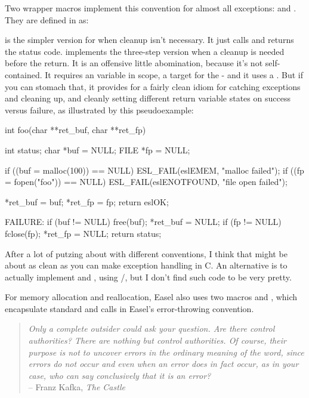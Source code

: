 Two wrapper macros implement this convention for almost all
exceptions:  and . They are
defined in  as:



 is the simpler version for when cleanup isn't
necessary. It just calls  and returns the status
code.  implements the three-step version when a
cleanup is needed before the return. It is an offensive little
abomination, because it's not self-contained. It requires an
 variable in scope, a  target for
the  - and it uses a . But if you can stomach
that, it provides for a fairly clean idiom for catching exceptions and
cleaning up, and cleanly setting different return variable states on
success versus failure, as illustrated by this pseudoexample:

\begin{cchunk}
int 
foo(char **ret_buf, char **ret_fp)
{
    int status;
    char *buf = NULL;
    FILE *fp  = NULL;

    if ((buf = malloc(100))  == NULL) ESL_FAIL(eslEMEM,      "malloc failed");
    if ((fp  = fopen("foo")) == NULL) ESL_FAIL(eslENOTFOUND, "file open failed");

    *ret_buf = buf;
    *ret_fp  = fp;
    return eslOK;

  FAILURE:
    if (buf != NULL) free(buf);  *ret_buf = NULL;
    if (fp  != NULL) fclose(fp); *ret_fp  = NULL;
    return status;
}
\end{cchunk}

After a lot of putzing about with different conventions, I think that
might be about as clean as you can make exception handling in C. An
alternative is to actually implement  and ,
using /, but I don't find such code
to be very pretty.

For memory allocation and reallocation, Easel also uses two macros
 and , which encapsulate
standard  and  calls in Easel's
error-throwing convention.


\vspace*{\fill}
\begin{quote}
\emph{Only a complete outsider could ask your question. Are there
control authorities? There are nothing but control authorities. Of
course, their purpose is not to uncover errors in the ordinary meaning
of the word, since errors do not occur and even when an error does in
fact occur, as in your case, who can say conclusively that it is an
error?}\\ \hspace*{\fill} -- Franz Kafka, \emph{The Castle}
\end{quote}     


